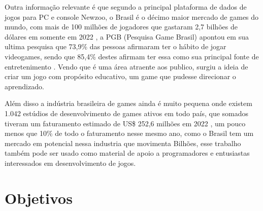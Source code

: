

Outra informação relevante é que segundo a principal plataforma de dados de jogos para PC e console  Newzoo, o Brasil é o décimo maior mercado de games do mundo, com mais de 100 milhões de jogadores que gastaram 2,7 bilhões de dólares em somente em 2022 \cite{NEWZOO}, a PGB (Pesquisa Game Brasil) apontou em sua ultima pesquisa que 73,9\% das pessoas afirmaram ter o hábito de jogar videogames, sendo que 85,4\% destes afirmam ter essa como sua principal fonte de entretenimento \cite{PGB} . Vendo que é uma área atraente aos publico, surgiu a ideia de criar um jogo com propósito educativo,  um game que pudesse  direcionar o aprendizado.

Além disso a indústria brasileira de games ainda é muito pequena onde existem 1.042 estúdios de desenvolvimento de games ativos em todo país, que somados tiveram um faturamento estimado de US\$ 252,6 milhões em 2022 \cite{Abragames}, um pouco menos que 10\% de todo o faturamento nesse mesmo ano, como o Brasil tem um mercado em potencial nessa industria que movimenta Bilhões, esse trabalho também pode ser usado como material de apoio a programadores e entusiastas interessados em desenvolvimento de jogos.




\section{Objetivos}
\label{sec-intro-obj}


